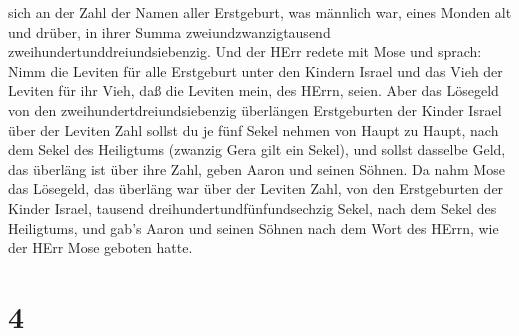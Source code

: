 sich an der Zahl der Namen aller Erstgeburt, was männlich war, eines
Monden alt und drüber, in ihrer Summa zweiundzwanzigtausend
zweihundertunddreiundsiebenzig.  Und der HErr redete mit
Mose und sprach:  Nimm die Leviten für alle Erstgeburt
unter den Kindern Israel und das Vieh der Leviten für ihr Vieh, daß die
Leviten mein, des HErrn, seien.  Aber das Lösegeld von den
zweihundertdreiundsiebenzig überlängen Erstgeburten der Kinder Israel
über der Leviten Zahl  sollst du je fünf Sekel nehmen von
Haupt zu Haupt, nach dem Sekel des Heiligtums (zwanzig Gera gilt ein
Sekel),  und sollst dasselbe Geld, das überläng ist über
ihre Zahl, geben Aaron und seinen Söhnen.  Da nahm Mose das
Lösegeld, das überläng war über der Leviten Zahl,  von den
Erstgeburten der Kinder Israel, tausend dreihundertundfünfundsechzig
Sekel, nach dem Sekel des Heiligtums,  und gab's Aaron und
seinen Söhnen nach dem Wort des HErrn, wie der HErr Mose geboten hatte.

\hypertarget{section-3}{%
\section{4}\label{section-3}}

